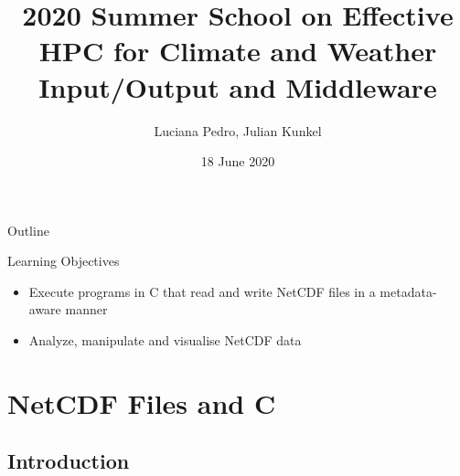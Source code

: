 \documentclass[compress,11pt,xcolor=svgnames,aspectratio=169]{beamer}
\title[Input/Output and Middleware -- Lab Session]{2020 Summer School on Effective HPC for Climate and Weather \\[0.5cm] Input/Output and Middleware}
\author[Pedro, Kunkel]{Luciana Pedro, Julian Kunkel
}
\institute[WP4 Team]{Department of Computer Science, University of Reading}
\date{18 June 2020}
\begin{document}
\begin{frame}[plain]
    \titlepage
\end{frame}

\begin{withoutheadline}
\begin{frame}{Outline}
    \begin{centering}
    \tableofcontents[hideallsubsections]
    \end{centering}

    \disclaimer
\end{frame}
\end{withoutheadline}


\begin{frame}[fragile]{Learning Objectives}

\begin{itemize}
\setlength\itemsep{1cm}
  \item Execute programs in C that read and write NetCDF files in a metadata-aware manner
  \item Analyze, manipulate and visualise NetCDF data
\end{itemize}

\end{frame}

\section{NetCDF Files and C}


\subsection{Introduction}
\end{document}
